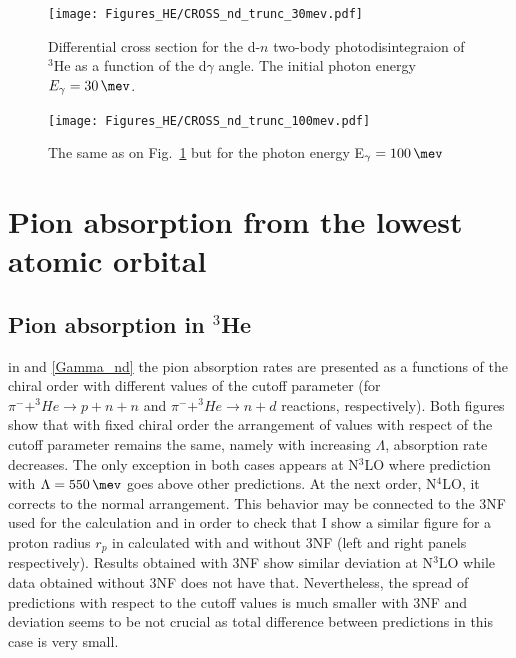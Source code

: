 \begin{figure}[h]
    \begin{center}
        \texttt{[image: Figures\_HE/CROSS\_nd\_trunc\_30mev.pdf]}
        \end{center}
        \caption{Differential cross section for the d-$n$ 
        two-body photodisintegraion of $^3$He as a function of the d$\gamma$ angle.
        The initial photon energy $E_\gamma=\SI{30}{\mev}$.}
        \label{CROSS_nd_30}
    \end{figure}


    \begin{figure}[h]
        \begin{center}
        \texttt{[image: Figures\_HE/CROSS\_nd\_trunc\_100mev.pdf]}
        \end{center}
        \caption{The same as on Fig.~\ref{CROSS_nd_30} but 
        for the photon energy E$_\gamma=\SI{100}{\mev}$}
        \label{CROSS_nd_100}
    \end{figure}

    \clearpage

\section{Pion absorption from the lowest atomic orbital}
\label{sec:pion_results}

    \subsection{Pion absorption in $^3$He}

    in  and \ref{Gamma_nd} the pion absorption rates are presented as a functions
    of the chiral order with different values of the cutoff parameter
    (for $\pi^- + ^3He \rightarrow p + n + n$ and $\pi^- + ^3He \rightarrow n + d$ reactions, respectively).
    Both figures show that with fixed chiral order the arrangement of values with respect of the cutoff parameter
    remains the same, namely with increasing $\Lambda$, absorption rate decreases. The only exception in both cases 
    appears at N$^3$LO where prediction with $\Lambda = \SI{550}{\mev}$ goes above other predictions.
    At the next order, N$^4$LO, it corrects to the normal arrangement.
    This behavior may be connected to the 3NF used for the calculation and in order to check that I show
    a similar figure for a proton radius $r_p$ in  calculated with 
    and without 3NF (left and right panels respectively). Results obtained with 3NF show
    similar deviation at N$^3$LO while data obtained without 3NF does not have that.
    Nevertheless, the spread of predictions with respect to the cutoff values is much smaller
    with 3NF and deviation seems to be not crucial as total difference
    between predictions in this case is very small.




